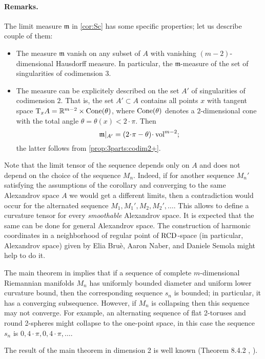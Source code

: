 \paragraph{Remarks.}
The limit measure $\mathfrak m$ in \ref{cor:Sc} has some specific properties;
let us describe couple of them:
\begin{itemize}
\item The measure $\mathfrak m$ vanish on any subset of $A$ with vanishing $(m-2)$-dimensional Hausdorff measure.
In particular, the $\mathfrak m$-measure of the set of singularities of codimension 3.

\item The measure can be explicitely described 
on the set $A'$ of singularities
of codimension $2$. That is, the set $A'\subset A$
contains all points $x$ with tangent space
$\mathrm{T}_xA=\mathbb{R}^{m-2}\times \operatorname{Cone}(\theta)$,
where $\operatorname{Cone}(\theta)$ denotes a $2$-dimensional cone
with the total angle $\theta=\theta(x)<2\cdot\pi$.
Then 
$$\mathfrak m|_{A'}=(2\cdot \pi-\theta)\cdot \vol^{m-2};$$
the latter follows from \ref{prop:3parts:codim2+}.
\end{itemize}


Note that the limit tensor of the sequence depends only on $A$ and does not depend on the choice of the sequence $M_n$.
Indeed, if for another sequence $M_n'$ satisfying the assumptions of the corollary and converging to the same Alexandrov space $A$ we would get a different limits, 
then a contradiction would occur for the alternated sequence $M_1,M_1',M_2,M_2',\dots$. This allows to define a curvature
tensor for every \emph{smoothable} Alexandrov space.
It is expected that the same can be done for general Alexandrov space.
The construction of harmonic coordinates in a neighborhood of regular point of $\operatorname{RCD}$-space (in particular, Alexandrov space) given by Elia Bruè, Aaron Naber, and Daniele Semola \cite{BNS} might help to do it.

The main theorem in \cite{petrunin-SC} implies that if a sequence of complete $m$-dimensional Riemannian  manifolds $M_n$ has uniformly bounded diameter and uniform lower curvature bound, then 
the corresponding sequence $s_n$ is bounded;
in particular, it has a converging subsequence.
However, if $M_n$ is collapsing then this sequence may not converge.
For example, an alternating sequence of flat 2-toruses and round 2-spheres might collapse to the one-point space, in this case the sequence $s_n$ is $0,4\cdot\pi,0,4\cdot\pi,\dots$.

The result of the main theorem in dimension 2 is well
 known (Theorem 8.4.2 \cite{Resh}, \cite{AZ} ).


